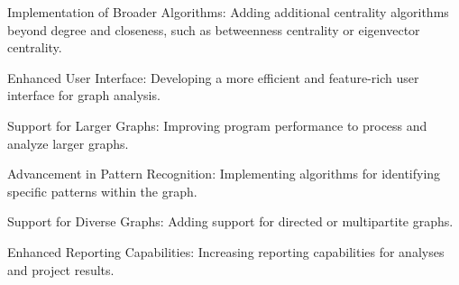 \documentclass{article}
\begin{document}
Implementation of Broader Algorithms: Adding additional centrality algorithms beyond degree and closeness, such as betweenness centrality or eigenvector centrality.

Enhanced User Interface: Developing a more efficient and feature-rich user interface for graph analysis.

Support for Larger Graphs: Improving program performance to process and analyze larger graphs.

Advancement in Pattern Recognition: Implementing algorithms for identifying specific patterns within the graph.

Support for Diverse Graphs: Adding support for directed or multipartite graphs.

Enhanced Reporting Capabilities: Increasing reporting capabilities for analyses and project results.
\end{document}
